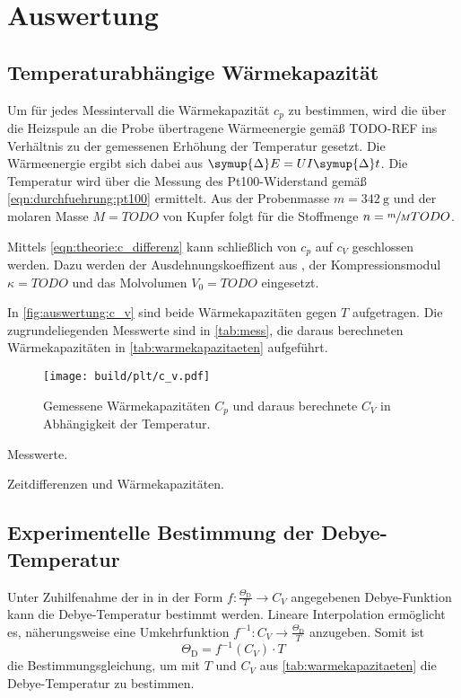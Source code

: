 \section{Auswertung}
\label{sec:auswertung}

\subsection{Temperaturabhängige Wärmekapazität}
Um für jedes Messintervall die Wärmekapazität $c_p$ zu bestimmen,
wird die über die Heizspule an die Probe übertragene Wärmeenergie
 gemäß TODO-REF
ins Verhältnis zu der gemessenen Erhöhung der Temperatur gesetzt.
Die Wärmeenergie ergibt sich dabei aus $\symup{\Delta}E = U I \symup{\Delta}t$.
Die Temperatur wird über die Messung des Pt100-Widerstand gemäß \autoref{eqn:durchfuehrung:pt100} ermittelt.
Aus der Probenmasse $m = \SI{342}{\gram}$ \cite{versuchsanleitung} und der molaren Masse $M = TODO$ von Kupfer
folgt für die Stoffmenge $n = \sfrac{m}{M} TODO$.

Mittels \autoref{eqn:theorie:c_differenz} kann schließlich von $c_p$ auf $c_V$ geschlossen werden.
Dazu werden
der Ausdehnungskoeffizent aus \cite[Tabelle 2]{versuchsanleitung},
der Kompressionsmodul $\kappa = TODO$ und
das Molvolumen $V_0 = TODO$ eingesetzt.

In \autoref{fig:auswertung:c_v} sind beide Wärmekapazitäten gegen $T$ aufgetragen.
Die zugrundeliegenden Messwerte sind in \autoref{tab:mess},
die daraus berechneten Wärmekapazitäten in \autoref{tab:warmekapazitaeten} aufgeführt.

\begin{figure}[H]
    \centering
    \texttt{[image: build/plt/c\_v.pdf]}
    \caption{Gemessene Wärmekapazitäten $C_p$ und daraus berechnete $C_V$ in Abhängigkeit der Temperatur.}
    \label{fig:auswertung:c_v}
\end{figure}

\begin{table}
    \centering
    \caption{Messwerte.}
    \label{tab:mess}
\end{table}

\begin{table}
    \centering
    \caption{Zeitdifferenzen und Wärmekapazitäten.}
    \label{tab:warmekapazitaeten}
\end{table}


\subsection{Experimentelle Bestimmung der Debye-Temperatur}
Unter Zuhilfenahme der in \cite[Tabelle 1]{versuchsanleitung}
in der Form $f: \frac{\Theta_\text{D}}{T} \longrightarrow C_V$
angegebenen Debye-Funktion
kann die Debye-Temperatur bestimmt werden.
Lineare Interpolation ermöglicht es, näherungsweise eine Umkehrfunktion
$f^{-1}: C_V \longrightarrow \frac{\Theta_\text{D}}{T}$
anzugeben.
Somit ist
\[
    \Theta_\text{D} = f^{-1}(C_V) · T
\]
die Bestimmungsgleichung, um mit $T$ und $C_V$ aus \autoref{tab:warmekapazitaeten} die Debye-Temperatur zu bestimmen.


